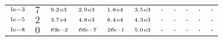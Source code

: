 \begin{tiny}
\begin{tabular}{@{$\;$}c@{$\;$}|@{$\;$}c@{$\;$}@{$\;$}c@{$\;$}@{$\;$}c@{$\;$}@{$\;$}c@{$\;$}@{$\;$}c@{$\;$}|@{$\;$}c@{$\;$}@{$\;$}c@{$\;$}@{$\;$}c@{$\;$}@{$\;$}c@{$\;$}@{$\;$}c@{$\;$}}
$\scriptstyle1\!\mathrm{\hspace{0.10em}e}-3$ & $\scriptstyle7$ & $\scriptstyle9.2\mathrm{\hspace{0.10em}e}3$ & $\scriptstyle2.9\mathrm{\hspace{0.10em}e}3$ & $\scriptstyle1.8\mathrm{\hspace{0.10em}e}4$ & $\scriptstyle3.5\mathrm{\hspace{0.10em}e}3$ & $\scriptstyle.$ & $\scriptstyle.$ & $\scriptstyle.$ & $\scriptstyle.$ & $\scriptstyle.$\\ 
$\scriptstyle1\!\mathrm{\hspace{0.10em}e}-5$ & $\scriptstyle2$ & $\scriptstyle3.7\mathrm{\hspace{0.10em}e}4$ & $\scriptstyle4.8\mathrm{\hspace{0.10em}e}3$ & $\scriptstyle8.4\mathrm{\hspace{0.10em}e}4$ & $\scriptstyle4.3\mathrm{\hspace{0.10em}e}3$ & $\scriptstyle.$ & $\scriptstyle.$ & $\scriptstyle.$ & $\scriptstyle.$ & $\scriptstyle.$\\ 
$\scriptstyle1\!\mathrm{\hspace{0.10em}e}-8$ & $\scriptstyle0$ & $\scriptstyle\textit{69}\hspace{0.00em}e\textit{--2}$ & $\scriptstyle\textit{66}\hspace{0.00em}e\textit{--7}$ & $\scriptstyle\textit{26}\hspace{0.00em}e\textit{--1}$ & $\scriptstyle5.0\mathrm{\hspace{0.10em}e}3$ & $\scriptstyle.$ & $\scriptstyle.$ & $\scriptstyle.$ & $\scriptstyle.$ & $\scriptstyle.$\\ 
\end{tabular} 
\end{tiny} 
